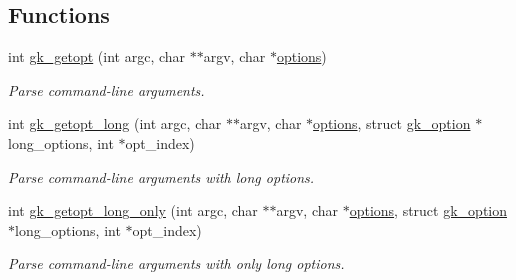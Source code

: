 \subsection*{Functions}
\begin{DoxyCompactItemize}
\item 
int \hyperlink{a00038_af82cf3b0fb9ec4411a987f02df3b2e47}{gk\+\_\+getopt} (int argc, char $\ast$$\ast$argv, char $\ast$\hyperlink{a00879_a68c032ed4161802775c6847d4cb39adf}{options})
\begin{DoxyCompactList}\small\item\em Parse command-\/line arguments. \end{DoxyCompactList}\item 
int \hyperlink{a00038_a1c3b8d80bd9620dc66f24d4854c0f6d3}{gk\+\_\+getopt\+\_\+long} (int argc, char $\ast$$\ast$argv, char $\ast$\hyperlink{a00879_a68c032ed4161802775c6847d4cb39adf}{options}, struct \hyperlink{a00630}{gk\+\_\+option} $\ast$long\+\_\+options, int $\ast$opt\+\_\+index)
\begin{DoxyCompactList}\small\item\em Parse command-\/line arguments with long options. \end{DoxyCompactList}\item 
int \hyperlink{a00038_abb224612ca0aae2d39bd87f6146bd67d}{gk\+\_\+getopt\+\_\+long\+\_\+only} (int argc, char $\ast$$\ast$argv, char $\ast$\hyperlink{a00879_a68c032ed4161802775c6847d4cb39adf}{options}, struct \hyperlink{a00630}{gk\+\_\+option} $\ast$long\+\_\+options, int $\ast$opt\+\_\+index)
\begin{DoxyCompactList}\small\item\em Parse command-\/line arguments with only long options. \end{DoxyCompactList}\end{DoxyCompactItemize}
